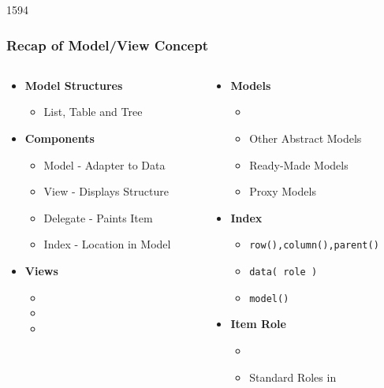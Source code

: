 \begin{slide}{1594}\frametitle{Recap of Model/View Concept}
\begin{columns}
  \begin{column}{50mm}
    \begin{itemize}
    \item \textbf{Model Structures}
      \begin{itemize}
      \item List, Table and Tree
      \end{itemize}
    \item \textbf{Components}
      \begin{itemize}
      \item Model - Adapter to Data
      \item View - Displays Structure
      \item Delegate - Paints Item
      \item Index - Location in Model
      \end{itemize}
    \item \textbf{Views}
      \begin{itemize}
      \item {}
      \item {}
      \item {}
      \end{itemize}
    \end{itemize}
  \end{column}
  \begin{column}{55mm}
    \begin{itemize}
    \item \textbf{Models}
      \begin{itemize}
      \item {}
      \item Other Abstract Models
      \item Ready-Made Models
      \item Proxy Models
      \end{itemize}
    \item \textbf{Index}
      \begin{itemize}
      \item \texttt{row(),column(),parent()}
      \item \texttt{data( role )}
      \item \texttt{model()}
      \end{itemize}
    \item \textbf{Item Role}
      \begin{itemize}
      \item {}
      \item Standard Roles in 
      \end{itemize}
   \end{itemize}
  \end{column}
\end{columns}
\end{slide}
